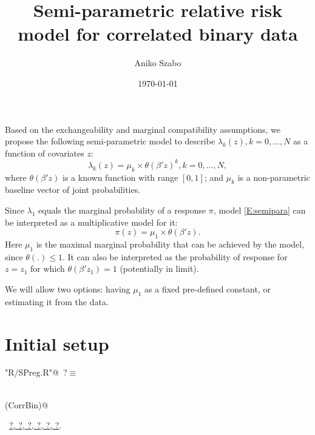 \documentclass[reqno]{amsart}
\title{Semi-parametric relative risk model for correlated binary data}
\author{Aniko Szabo}
\date{\today}
\renewcommand{\NWtarget}[2]{\hypertarget{#1}{#2}}
\renewcommand{\NWlink}[2]{\hyperlink{#1}{#2}}
\begin{document}
\maketitle

Based on the exchangeability and marginal compatibility assumptions, we propose the following semi-parametric model to describe  $\lambda_k(z), k=0,\ldots, N$ as a function of covariates $z$:
\begin{equation}\label{E:semipara}
	\lambda_k(z) = {\mu_k} \times {\theta(\beta' z)^k}, k = 0, \dots, N,
\end{equation}
where $\theta(\beta' z)$ is a known function with range $[0,1]$; and $\mu_k$ is a non-parametric baseline vector of joint probabilities.

Since $\lambda_1$ equals the marginal probability of a response $\pi$, model \eqref{E:semipara} can be interpreted as a multiplicative model for it:
\begin{equation*}
  \pi(z) = \mu_1 \times \theta(\beta'z).
\end{equation*}
Here $\mu_1$ is the maximal marginal probability that can be achieved by the model, since $\theta(.) \leq 1$. It can also be interpreted as the probability of response for $z=z_1$ for which $\theta(\beta'z_1) = 1$ (potentially in limit).

We will allow two options: having $\mu_1$ as a fixed pre-defined constant, or estimating it from the data.


\section{Initial setup}
\begin{flushleft} \small\label{scrap1}\raggedright\small
\NWtarget{nuweb?}{} \verb@"R/SPreg.R"@\nobreak\ {\footnotesize {?}}$\equiv$
\vspace{-1ex}
\begin{list}{}{} \item
\mbox{}\verb@@\\
\mbox{}\verb@require(CorrBin)@\\
\mbox{}\verb@@{\NWsep}
\end{list}
\vspace{-1.5ex}
\footnotesize
\begin{list}{}{\setlength{\itemsep}{-\parsep}\setlength{\itemindent}{-\leftmargin}}
\item \NWtxtFileDefBy\ \NWlink{nuweb?}{?}\NWlink{nuweb?}{, ?}\NWlink{nuweb?}{, ?}\NWlink{nuweb?}{, ?}\NWlink{nuweb?}{, ?}\NWlink{nuweb?}{, ?}.

\item{}
\end{list}
\vspace{4ex}
\end{flushleft}
\end{document}

